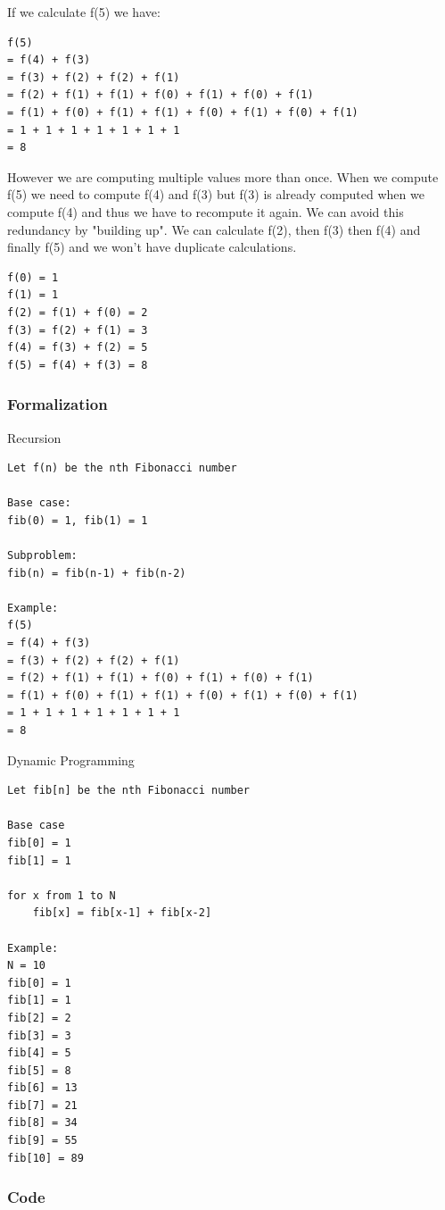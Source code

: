 \documentclass[11pt,oneside]{book}
\begin{document}
If we calculate f(5) we have:

\begin{lstlisting}
f(5) 
= f(4) + f(3) 
= f(3) + f(2) + f(2) + f(1) 
= f(2) + f(1) + f(1) + f(0) + f(1) + f(0) + f(1) 
= f(1) + f(0) + f(1) + f(1) + f(0) + f(1) + f(0) + f(1) 
= 1 + 1 + 1 + 1 + 1 + 1 + 1
= 8
\end{lstlisting}

However we are computing multiple values more than once. When we compute f(5) we need to compute f(4) and f(3) but f(3) is already computed when we compute f(4) and thus we have to recompute it again. We can avoid this redundancy by "building up". We can calculate f(2), then f(3) then f(4) and finally f(5) and we won't have duplicate calculations.

\begin{lstlisting}
f(0) = 1
f(1) = 1
f(2) = f(1) + f(0) = 2
f(3) = f(2) + f(1) = 3
f(4) = f(3) + f(2) = 5
f(5) = f(4) + f(3) = 8
\end{lstlisting}

\subsubsection{Formalization}

Recursion

\begin{lstlisting}
Let f(n) be the nth Fibonacci number

Base case:
fib(0) = 1, fib(1) = 1

Subproblem:
fib(n) = fib(n-1) + fib(n-2)

Example:
f(5) 
= f(4) + f(3) 
= f(3) + f(2) + f(2) + f(1) 
= f(2) + f(1) + f(1) + f(0) + f(1) + f(0) + f(1) 
= f(1) + f(0) + f(1) + f(1) + f(0) + f(1) + f(0) + f(1) 
= 1 + 1 + 1 + 1 + 1 + 1 + 1
= 8
\end{lstlisting}

Dynamic Programming

\begin{lstlisting}
Let fib[n] be the nth Fibonacci number

Base case
fib[0] = 1
fib[1] = 1

for x from 1 to N
    fib[x] = fib[x-1] + fib[x-2]

Example:
N = 10
fib[0] = 1
fib[1] = 1
fib[2] = 2
fib[3] = 3
fib[4] = 5
fib[5] = 8
fib[6] = 13
fib[7] = 21
fib[8] = 34
fib[9] = 55
fib[10] = 89
\end{lstlisting}

\subsubsection{Code}
\end{document}
